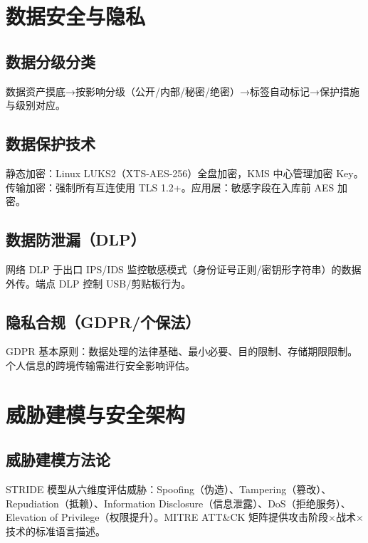 \documentclass[12pt,UTF8]{ctexbook}
\begin{document}
\chapter{数据安全与隐私}
\label{chap:data-security}

  \section{数据分级分类}

数据资产摸底→按影响分级（公开/内部/秘密/绝密）→标签自动标记→保护措施与级别对应。

  \section{数据保护技术}

静态加密：Linux LUKS2（XTS-AES-256）全盘加密，KMS 中心管理加密 Key。传输加密：强制所有互连使用 TLS 1.2+。应用层：敏感字段在入库前 AES 加密。

  \section{数据防泄漏（DLP）}

网络 DLP 于出口 IPS/IDS 监控敏感模式（身份证号正则/密钥形字符串）的数据外传。端点 DLP 控制 USB/剪贴板行为。

  \section{隐私合规（GDPR/个保法）}

GDPR 基本原则：数据处理的法律基础、最小必要、目的限制、存储期限限制。个人信息的跨境传输需进行安全影响评估。


\chapter{威胁建模与安全架构}
\label{chap:threat-modeling}

  \section{威胁建模方法论}

STRIDE 模型从六维度评估威胁：Spoofing（伪造）、Tampering（篡改）、Repudiation（抵赖）、Information Disclosure（信息泄露）、DoS（拒绝服务）、Elevation of Privilege（权限提升）。MITRE ATT\&CK 矩阵提供攻击阶段×战术×技术的标准语言描述。
\end{document}
